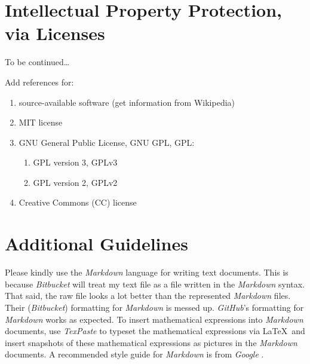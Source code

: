 \documentclass[letter,12pt]{article}
\begin{document}
\section{Intellectual Property Protection, via Licenses}
\label{sec:IntellectualPropertyProtectionViaLicenses}


{\Huge To be continued}\dots

Add references for: \vspace{-0.3cm}
\begin{enumerate} \itemsep -4pt
\item source-available software (get information from Wikipedia)
\item MIT license
\item GNU General Public License, GNU GPL, GPL: \vspace{-0.3cm}
	\begin{enumerate} \itemsep -2pt
	\item GPL version 3, GPLv3
	\item GPL version 2, GPLv2
	\end{enumerate}
\item Creative Commons (CC) license
\end{enumerate}













\section{Additional Guidelines}
\label{sec:AdditionalGuidelines}

Please kindly use the {\it Markdown} language for writing text documents. This is because {\it Bitbucket} will treat my text file as a file written in the {\it Markdown} syntax. That said, the raw file looks a lot better than the represented {\it Markdown} files. Their ({\it Bitbucket}) formatting for {\it Markdown} is messed up. {\it GitHub}'s formatting for {\it Markdown} works as expected. To insert mathematical expressions into {\it Markdown} documents, use {\it TexPaste} \cite{Nguyen2013} to typeset the mathematical expressions via \LaTeX\ and insert snapshots of these mathematical expressions as pictures in the {\it Markdown} documents. A recommended style guide for {\it Markdown} is from {\it Google} \cite{Turakulov2018}. \\
\end{document}
